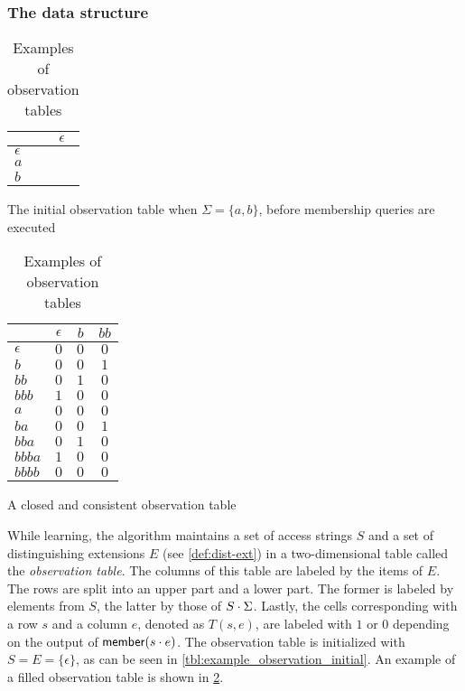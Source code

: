 \subsubsection{The data structure}
\label{sec:data-structure}
\begin{table}[t]
  \centering
  \begin{subtable}[h]{.45\textwidth}
    \centering
    \begin{tabular}{ | l || c | }
      \hline
                 & $\epsilon$ \\ \hline \hline
      $\epsilon$ &         \\ \hline \hline
      $a$        &         \\
      $b$        &         \\
      \hline
    \end{tabular}
    \caption{The initial observation table when $\Sigma=\{a,b\}$, before
    membership queries are executed}
    \label{tbl:example_observation_initial}
  \end{subtable}
  \begin{subtable}[h]{.45\textwidth}
    \centering
    \begin{tabular}{ | l || c | c | c | }
      \hline
                 & $\epsilon$ & $b$   & $bb$ \\ \hline \hline
      $\epsilon$ & $0$        & $0$   & $0$  \\
      $b$        & $0$        & $0$   & $1$  \\
      $bb$       & $0$        & $1$   & $0$  \\
      $bbb$      & $1$        & $0$   & $0$  \\ \hline \hline
      $a$        & $0$        & $0$   & $0$  \\
      $ba$       & $0$        & $0$   & $1$  \\
      $bba$      & $0$        & $1$   & $0$  \\
      $bbba$     & $1$        & $0$   & $0$  \\
      $bbbb$     & $0$        & $0$   & $0$  \\
      \hline
    \end{tabular}
    \caption{A closed and consistent observation table}
    \label{tbl:example_observation}
  \end{subtable}
  \caption{Examples of observation tables}
\end{table}

While learning, the algorithm maintains a set of access strings $S$ and a set of
distinguishing extensions $E$ (see \cref{def:dist-ext}) in a two-dimensional
table called the \textit{observation table}. The columns of this table are
labeled by the items of $E$. The rows are split into an upper part and a lower
part. The former is labeled by elements from $S$, the latter by those of
$S \cdot \Sigma$. Lastly, the cells corresponding with a row $s$ and a column
$e$, denoted as $T(s,e)$, are labeled with $1$ or $0$ depending on the output of
$\mathsf{member}(s \cdot e)$. The observation table is initialized with
$S = E = \{\epsilon\}$, as can be seen in
\cref{tbl:example_observation_initial}. An example of a filled observation table
is shown in \cref{tbl:example_observation}.

